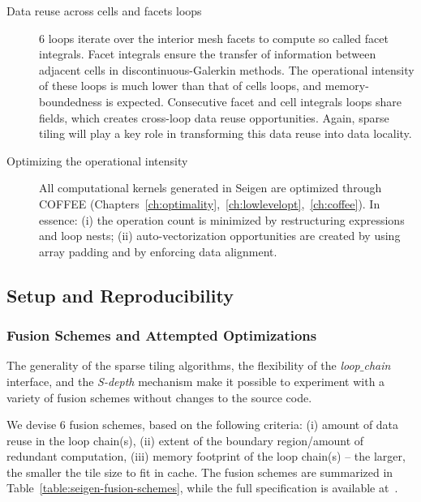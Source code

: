 \begin{description}
\item[Data reuse across cells and facets loops] 6 loops iterate over the interior mesh facets to compute so called facet integrals. Facet integrals ensure the transfer of information between adjacent cells in discontinuous-Galerkin methods. The operational intensity of these loops is much lower than that of cells loops, and memory-boundedness is expected. Consecutive facet and cell integrals loops share fields, which creates cross-loop data reuse opportunities. Again, sparse tiling will play a key role in transforming this data reuse into data locality.

\item[Optimizing the operational intensity] All computational kernels generated in Seigen are optimized through COFFEE (Chapters~\ref{ch:optimality},~\ref{ch:lowlevelopt},~\ref{ch:coffee}). In essence: (i) the operation count is minimized by restructuring expressions and loop nests; (ii) auto-vectorization opportunities are created by using array padding and by enforcing data alignment.
\end{description}



\subsection{Setup and Reproducibility}



\subsubsection{Fusion Schemes and Attempted Optimizations}
The generality of the sparse tiling algorithms, the flexibility of the {\em loop$\_$chain} interface, and the {\em S-depth} mechanism make it possible to experiment with a variety of fusion schemes without changes to the source code. 

We devise 6 fusion schemes, based on the following criteria: (i) amount of data reuse in the loop chain(s), (ii) extent of the boundary region/amount of redundant computation, (iii) memory footprint of the loop chain(s) -- the larger, the smaller the tile size to fit in cache. The fusion schemes are summarized in Table~\ref{table:seigen-fusion-schemes}, while the full specification is available at~\cite{seigen-code}.

